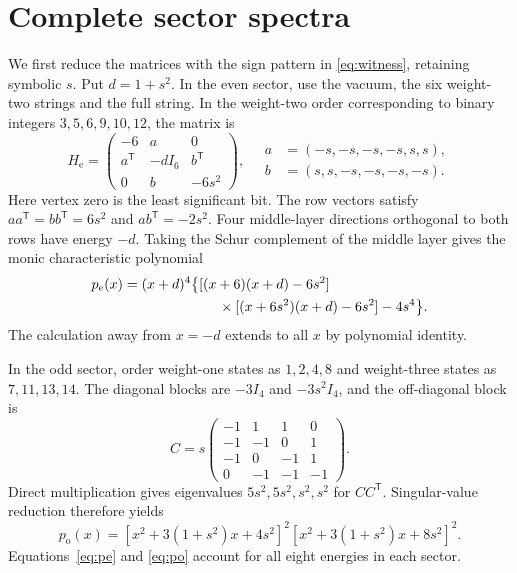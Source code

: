 \documentclass[11pt]{article}
\begin{document}
\section{Complete sector spectra}
We first reduce the matrices with the sign pattern in \eqref{eq:witness}, retaining symbolic $s$. Put $d=1+s^2$. In the even sector, use the vacuum, the six weight-two strings and the full string. In the weight-two order corresponding to binary integers $3,5,6,9,10,12$, the matrix is
\begin{equation}
 H_{\mathrm e}=\begin{pmatrix}-6&a&0\\a^{\mathsf T}&-dI_6&b^{\mathsf T}\\0&b&-6s^2\end{pmatrix},\quad
 \begin{aligned}a&=(-s,-s,-s,-s,s,s),\\b&=(s,s,-s,-s,-s,-s).\end{aligned}
 \label{eq:evenblock}
\end{equation}
Here vertex zero is the least significant bit. The row vectors satisfy
$aa^{\mathsf T}=bb^{\mathsf T}=6s^2$ and $ab^{\mathsf T}=-2s^2$.
Four middle-layer directions orthogonal to both rows have energy $-d$. Taking the Schur complement of the middle layer gives the monic characteristic polynomial
\begin{align}
 p_{\mathrm e}(x)&=(x+d)^4\big\{[(x+6)(x+d)-6s^2]\notag\\
 &\hspace{24mm}\times[(x+6s^2)(x+d)-6s^2]-4s^4\big\}.
 \label{eq:pe}
\end{align}
The calculation away from $x=-d$ extends to all $x$ by polynomial identity.

In the odd sector, order weight-one states as $1,2,4,8$ and weight-three states as $7,11,13,14$. The diagonal blocks are $-3I_4$ and $-3s^2I_4$, and the off-diagonal block is
\begin{equation}
 C=s\begin{pmatrix}-1&1&1&0\\-1&-1&0&1\\-1&0&-1&1\\0&-1&-1&-1\end{pmatrix}.
\end{equation}
Direct multiplication gives eigenvalues $5s^2,5s^2,s^2,s^2$ for $CC^{\mathsf T}$. Singular-value reduction therefore yields
\begin{equation}
 p_{\mathrm o}(x)=[x^2+3(1+s^2)x+4s^2]^2[x^2+3(1+s^2)x+8s^2]^2.
 \label{eq:po}
\end{equation}
Equations~\eqref{eq:pe} and \eqref{eq:po} account for all eight energies in each sector.
\end{document}
